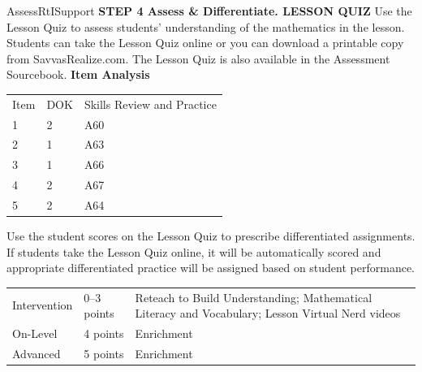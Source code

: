 \documentclass{article}
\newenvironment{te-addendum}[2]{}{}     %
\begin{document}
\begin{te-addendum}{Assess}{RtISupport}
\textbf{STEP 4 Assess \& Differentiate. LESSON QUIZ}
Use the Lesson Quiz to assess students' understanding of the mathematics in the lesson.
Students can take the Lesson Quiz online or you can download a printable copy from SavvasRealize.com. The Lesson Quiz is also available in the Assessment Sourcebook.
\textbf{Item Analysis}
\begin{tabular}{lll}
Item & DOK & Skills Review and Practice \\
1 & 2 & A60 \\
2 & 1 & A63 \\
3 & 1 & A66 \\
4 & 2 & A67 \\
5 & 2 & A64 \\
\end{tabular}
Use the student scores on the Lesson Quiz to prescribe differentiated assignments.
If students take the Lesson Quiz online, it will be automatically scored and appropriate differentiated practice will be assigned based on student performance.
\begin{tabular}{lll}
Intervention & 0--3 points & Reteach to Build Understanding; Mathematical Literacy and Vocabulary; Lesson Virtual Nerd videos \\
On-Level & 4 points & Enrichment \\
Advanced & 5 points & Enrichment \\
\end{tabular}
\end{te-addendum}
\end{document}
